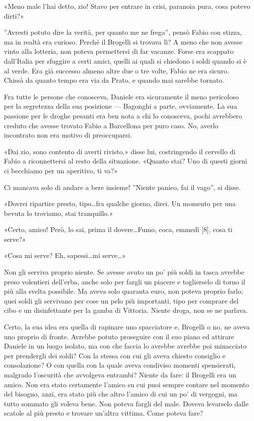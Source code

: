 «Meno male l'hai detto, zio! Stavo per entrare in crisi, paranoia pura, cosa potevo dirti?»

''Avresti potuto dire la verità, per quanto me ne frega'', pensò Fabio con stizza, ma in realtà era curioso. Perché il Brogelli si trovava lì? A meno che non avesse vinto alla lotteria, non poteva permettersi di far vacanze. Forse era scappato dall'Italia per sfuggire a certi amici, quelli ai quali si chiedono i soldi quando si è al verde. Era già successo almeno altre due o tre volte, Fabio ne era sicuro. Chissà da quanto tempo era via da Prato, e quando mai sarebbe tornato.

Fra tutte le persone che conosceva, Daniele era sicuramente il meno pericoloso per la segretezza della sua posizione --- Bagonghi a parte, ovviamente. La sua passione per le droghe pesanti era ben nota a chi lo conosceva, pochi avrebbero creduto che avesse trovato Fabio a Barcellona per puro caso. No, averlo incontrato non era motivo di preoccuparsi.

«Dai zio, sono contento di averti rivisto.» disse lui, costringendo il cervello di Fabio a riconnettersi al resto della situazione. «Quanto stai? Uno di questi giorni ci becchiamo per un aperitivo, ti va?»

Ci mancava solo di andare a bere insieme! ''Niente panico, fai il vago'', si disse.

«Dovrei ripartire presto, tipo\ldots fra qualche giorno, direi. Un momento per una bevuta lo troviamo, stai tranquillo.»

«Certo, amico! Però, lo sai, prima il dovere\ldots Fumo, coca, emmedì [8], cosa ti serve?»

«Cosa mi serve? Eh, sapessi\ldots mi serve\ldots»

Non gli serviva proprio niente. Se avesse avuto un po' più soldi in tasca avrebbe preso volentieri dell'erba, anche solo per fargli un piacere e toglierselo di torno il più alla svelta possibile. Ma aveva solo quaranta euro, non poteva proprio farlo; quei soldi gli servivano per cose un pelo più importanti, tipo per comprare del cibo e un disinfettante per la gamba di Vittoria. Niente droga, non se ne parlava.

Certo, la sua idea era quella di rapinare uno spacciatore e, Brogelli o no, ne aveva uno proprio di fronte. Avrebbe potuto proseguire con il suo piano ed attirare Daniele in un luogo isolato, ma con che faccia lo avrebbe avrebbe poi minacciato per prendergli dei soldi? Con la stessa con cui gli aveva chiesto consiglio e consolazione? O con quella con la quale aveva condiviso momenti spensierati, malgrado l'oscurità che avvolgeva entrambi? Niente da fare: il Brogelli era un amico. Non era stato certamente l'amico su cui puoi sempre contare nel momento del bisogno, anzi, era stato più che altro l'amico di cui un po' di vergogni, ma tutto sommato gli voleva bene. Non poteva fargli del male. Doveva levarselo dalle scatole al più presto e trovare un'altra vittima. Come poteva fare?

